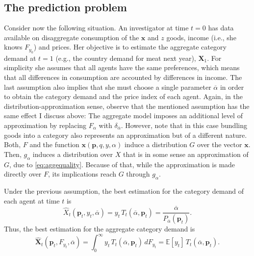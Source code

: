 \documentclass[english, a4paper, 12pt]{article}
\begin{document}
\subsection{The prediction problem}
Consider now the following situation. An investigator at time $t = 0$ has data available on disaggregate consumption of the $\mathbf{x}$ and $z$ goods, income (i.e., she knows $F_{y_{0}}$) and prices. Her objective is to estimate the aggregate category demand at $t=1$ (e.g., the country demand for meat next year), $\mathbf{X}_{1}$. For simplicity she assumes that all agents have the same preferences, which means that all differences in consumption are accounted by differences in income. The last assumption also implies that she must choose a single parameter $\overline{\alpha}$ in order to obtain the category demand and the price index of each agent. Again, in the distribution-approximation sense, observe that the mentioned assumption has the same effect I discuss above: The aggregate model imposes an additional level of approximation by replacing  $F_{\alpha}$ with $\delta_{\overline{\alpha}}$. However, note that in this case bundling goods into a category also represents an approximation but of a different nature. Both, $F$ and the function $\mathbf{x}(\mathbf{p}, q, y, \alpha)$ induce a distribution $G$ over the vector $\mathbf{x}$. Then, $g_{\alpha}$ induces a distribution over $X$ that is in some sense an approximation of $G$, due to \eqref{eq:aggequality}. Because of that, while the approximation is made directly over $F$, its implications reach $G$ through $g_{\alpha}$.

Under the previous assumption, the best estimation for the category demand of each agent at time $t$ is
	$$\widehat{X}_{t}(\mathbf{p}_{t}, y_{t}, \overline{\alpha}) = y_{t}\, T_{t}(\overline{\alpha}, \mathbf{p}_{t}) = \frac{\overline{\alpha}}{P_{\overline{\alpha}}(\mathbf{p}_{t})}.$$
Thus, the best estimation for the aggregate category demand is
	\begin{equation} \label{eq:AggCatDemand}
		\widehat{\mathbf{X}}_{t}(\mathbf{p}_{t}, F_{y_{t}}, \overline{\alpha}) 
			= \int_{0}^{\infty}y_{t}\, T_{t}(\overline{\alpha}, \mathbf{p}_{t}) \, dF_{y_{t}}
			= \mathbb{E}[y_{t}]\, T_{t}(\overline{\alpha}, \mathbf{p}_{t}).
	\end{equation}

\end{document}

